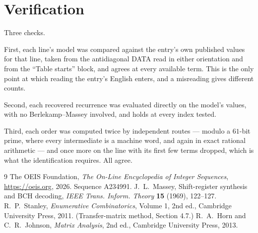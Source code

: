 \documentclass[11pt,a4paper]{article}
\theoremstyle{plain}
\theoremstyle{definition}
\begin{document}
\section{Verification}

Three checks.

First, each line's model was compared against the entry's own published values for that line,
taken from the antidiagonal DATA read in either orientation and from the ``Table starts''
block, and agrees at every available term. This is the only point at which reading the entry's
English enters, and a misreading gives different counts.

Second, each recovered recurrence was evaluated directly on the model's values, with no
Berlekamp--Massey involved, and holds at every index tested.

Third, each order was computed twice by independent routes --- modulo a $61$-bit prime, where
every intermediate is a machine word, and again in exact rational arithmetic --- and once more
on the line with its first few terms dropped, which is what the identification requires. All
agree.

\begin{thebibliography}{9}
 The OEIS Foundation, \emph{The On-Line Encyclopedia of Integer
Sequences}, \url{https://oeis.org}, 2026. Sequence A234991.
 J.~L.~Massey, Shift-register synthesis and BCH decoding, \emph{IEEE
Trans. Inform. Theory} \textbf{15} (1969), 122--127.
 R.~P.~Stanley, \emph{Enumerative Combinatorics}, Volume 1, 2nd ed.,
Cambridge University Press, 2011. (Transfer-matrix method, Section 4.7.)
 R.~A.~Horn and C.~R.~Johnson, \emph{Matrix Analysis}, 2nd ed., Cambridge
University Press, 2013.
\end{thebibliography}
\end{document}
